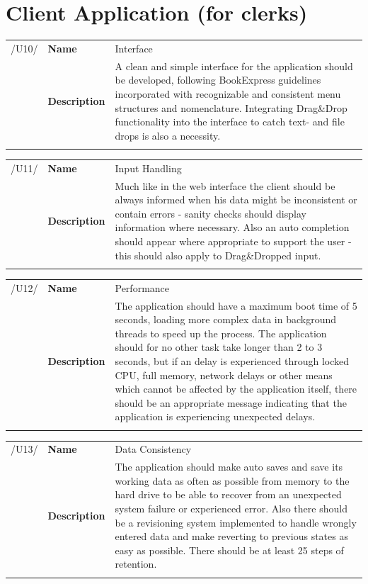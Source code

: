 \documentclass[11pt,a4paper,oneside,svgnames]{report}
\begin{document}
\section{Client Application (for clerks)}
\noindent
\begin{tabular}{llp{8cm}}
\cellcolor{white}/U10/	& \textbf{Name}			& Interface\\
\cellcolor{white}		& \textbf{Description}	& A clean and simple interface for the application should be developed, following BookExpress guidelines incorporated with recognizable and consistent menu structures and nomenclature. Integrating Drag\&Drop functionality into the interface to catch text- and file drops is also a necessity.\\
\cellcolor{white}		\hfill \\
\end{tabular}

\noindent
\begin{tabular}{llp{8cm}}
\cellcolor{white}/U11/	& \textbf{Name}			& Input Handling\\
\cellcolor{white}		& \textbf{Description}	& Much like in the web interface the client should be always informed when his data might be inconsistent or contain errors - sanity checks should display information where necessary. Also an auto completion should appear where appropriate to support the user - this should also apply to Drag\&Dropped input.\\
\cellcolor{white}		\hfill \\
\end{tabular}

\noindent
\begin{tabular}{llp{8cm}}
\cellcolor{white}/U12/	& \textbf{Name}			& Performance\\
\cellcolor{white}		& \textbf{Description}	& The application should have a maximum boot time of 5 seconds, loading more complex data in background threads to speed up the process. The application should for no other task take longer than 2 to 3 seconds, but if an delay is experienced through locked CPU, full memory, network delays or other means which cannot be affected by the application itself, there should be an appropriate message indicating that the application is experiencing unexpected delays.\\
\cellcolor{white}		\hfill \\
\end{tabular}

\noindent
\begin{tabular}{llp{8cm}}
\cellcolor{white}/U13/	& \textbf{Name}			& Data Consistency\\
\cellcolor{white}		& \textbf{Description}	& The application should make auto saves and save its working data as often as possible from memory to the hard drive to be able to recover from an unexpected system failure or experienced error. Also there should be a revisioning system implemented to handle wrongly entered data and make reverting to previous states as easy as possible. There should be at least 25 steps of retention.\\
\cellcolor{white}		\hfill \\
\end{tabular}
\end{document}

